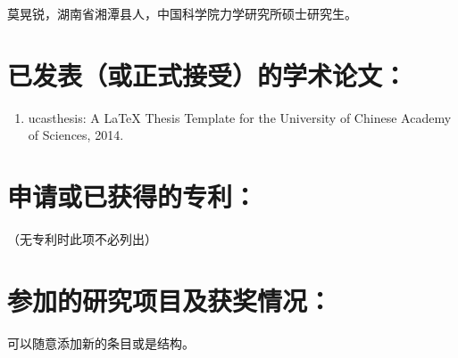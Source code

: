 莫晃锐，湖南省湘潭县人，中国科学院力学研究所硕士研究生。

\section*{已发表（或正式接受）的学术论文：}

{
\setlist[enumerate]{}%
\begin{enumerate}[nosep]
    \item ucasthesis: A LaTeX Thesis Template for the University of Chinese Academy of Sciences, 2014.
\end{enumerate}
}

\section*{申请或已获得的专利：}

（无专利时此项不必列出）

\section*{参加的研究项目及获奖情况：}

可以随意添加新的条目或是结构。

\cleardoublepage[plain]%
